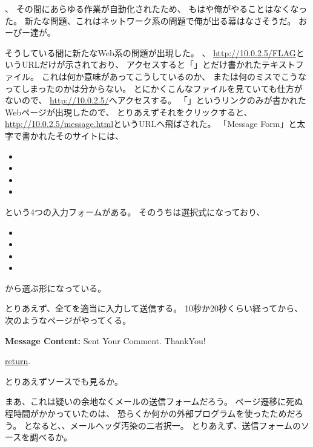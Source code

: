 、
その間にあらゆる作業が自動化されたため、
もはや俺がやることはなくなった。
新たな問題、これはネットワーク系の問題で俺が出る幕はなさそうだ。
おーぴー達が。

そうしている間に新たなWeb系の問題が出現した。
、
\url{http://10.0.2.5/FLAG}というURLだけが示されており、
アクセスすると「」とだけ書かれたテキストファイル。
これは何か意味があってこうしているのか、
または何のミスでこうなってしまったのかは分からない。
とにかくこんなファイルを見ていても仕方がないので、
\url{http://10.0.2.5/}へアクセスする。
「」というリンクのみが書かれたWebページが出現したので、
とりあえずそれをクリックすると、\url{http://10.0.2.5/message.html}というURLへ飛ばされた。
「Message Form」と太字で書かれたそのサイトには、

\begin{itemize}
	\item {}
	\item {}
	\item {}
	\item {}
\end{itemize}

という4つの入力フォームがある。
そのうちは選択式になっており、

\begin{itemize}
	\item {}
	\item {}
	\item {}
	\item {}
\end{itemize}

から選ぶ形になっている。

とりあえず、全てを適当に入力して送信する。
10秒か20秒くらい経ってから、次のようなページがやってくる。

\begin{itembox}[c]{\textbf{Message Content:}}
Sent Your Comment. ThankYou!

\underline{return}. 
\end{itembox}

とりあえずソースでも見るか。



まあ、これは疑いの余地なくメールの送信フォームだろう。
ページ遷移に死ぬ程時間がかかっていたのは、
恐らくか何かの外部プログラムを使ったためだろう。
となると、、メールヘッダ汚染の二者択一。
とりあえず、送信フォームのソースを調べるか。

